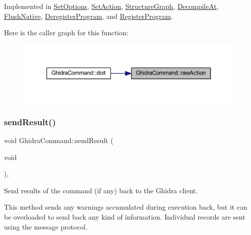 Implemented in \mbox{\hyperlink{class_set_options_a1e73126b79340651e9fa9cfc47e80649}{Set\+Options}}, \mbox{\hyperlink{class_set_action_af53890c4472a36b4c78d0c97bb1f39d4}{Set\+Action}}, \mbox{\hyperlink{class_structure_graph_a498c9004314b3845ca36c46f77b43ed6}{Structure\+Graph}}, \mbox{\hyperlink{class_decompile_at_ae5dfee8a7e5fd8343f7cf59e53d4f78c}{Decompile\+At}}, \mbox{\hyperlink{class_flush_native_a92fb03dcd3fb080a2033442403cde93c}{Flush\+Native}}, \mbox{\hyperlink{class_deregister_program_a3086821f7a4e57a5f3cf585513d48b73}{Deregister\+Program}}, and \mbox{\hyperlink{class_register_program_ae79c022fba3244f9969aa007058f4b53}{Register\+Program}}.

Here is the caller graph for this function\+:
\nopagebreak
\begin{figure}[H]
\begin{center}
\leavevmode
\includegraphics[width=350pt]{class_ghidra_command_a7d1a5cfedfd8f1d05161d27627302716_icgraph}
\end{center}
\end{figure}
\mbox{\label{class_ghidra_command_a964ade9b1f768c55434d412834ba2eca}} 
\subsubsection{\texorpdfstring{sendResult()}{sendResult()}}
{\footnotesize\ttfamily void Ghidra\+Command\+::send\+Result (\begin{DoxyParamCaption}\item[{void}]{ }\end{DoxyParamCaption})\hspace{0.3cm}{\ttfamily [protected]}, {\ttfamily [virtual]}}



Send results of the command (if any) back to the Ghidra client. 

This method sends any warnings accumulated during execution back, but it can be overloaded to send back any kind of information. Individual records are sent using the message protocol. 

